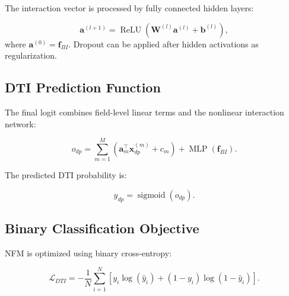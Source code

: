 The interaction vector is processed by fully connected hidden layers:

\begin{equation}
    \mathbf{a}^{(l+1)}
    =
    \operatorname{ReLU}
    \left(
        \mathbf{W}^{(l)}\mathbf{a}^{(l)}+\mathbf{b}^{(l)}
    \right),
\end{equation}
where $\mathbf{a}^{(0)}=\mathbf{f}_{BI}$. Dropout can be applied after hidden
activations as regularization.

\subsection{DTI Prediction Function}

The final logit combines field-level linear terms and the nonlinear interaction
network:

\begin{equation}
    o_{dp}
    =
    \sum_{m=1}^{M}
    \left(
        \mathbf{a}_{m}^{\top}\mathbf{x}_{dp}^{(m)}+c_m
    \right)
    +
    \operatorname{MLP}(\mathbf{f}_{BI}).
\end{equation}

The predicted DTI probability is:

\begin{equation}
    \hat{y}_{dp}=\operatorname{sigmoid}(o_{dp}).
\end{equation}

\subsection{Binary Classification Objective}

NFM is optimized using binary cross-entropy:

\begin{equation}
    \mathcal{L}_{DTI}
    =
    -\frac{1}{N}
    \sum_{i=1}^{N}
    \left[
        y_i\log(\hat{y}_i)
        +(1-y_i)\log(1-\hat{y}_i)
    \right].
\end{equation}
